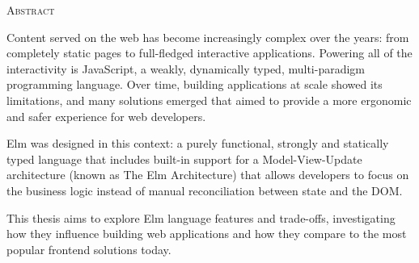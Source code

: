 \begin{center}
  \textsc{Abstract}
\end{center}
\noindent

Content served on the web has become increasingly complex over the years: from completely static pages to full-fledged interactive applications. Powering all of the interactivity is JavaScript, a weakly, dynamically typed, multi-paradigm programming language. Over time, building applications at scale showed its limitations, and many solutions emerged that aimed to provide a more ergonomic and safer experience for web developers.

Elm was designed in this context: a purely functional, strongly and statically typed language that includes built-in support for a Model-View-Update architecture (known as The Elm Architecture) that allows developers to focus on the business logic instead of manual reconciliation between state and the DOM.

This thesis aims to explore Elm language features and trade-offs, investigating how they influence building web applications and how they compare to the most popular frontend solutions today.
